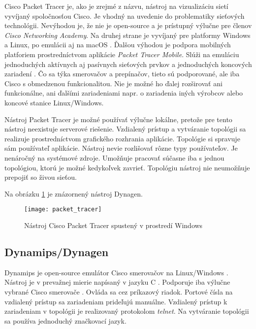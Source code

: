 Cisco Packet Tracer je, ako je zrejmé z názvu, nástroj na vizualizáciu sietí vyvíjaný spoločnosťou Cisco. Je vhodný na uvedenie do problematiky sieťových technológii. Nevýhodou je, že nie je open-source a je prístupný výlučne pre členov \emph{Cisco Networking Academy}. Na druhej strane je vyvíjaný pre platformy Windows a Linux, po emulácii aj na macOS \cite{packet_tracer_mac}. Ďalšou výhodou je podpora mobilných platforiem prostredníctvom aplikácie \emph{Packet Tracer Mobile}. Slúži na emuláciu jednoduchých aktívnych aj pasívnych sieťových prvkov a jednoduchých koncových zariadení \cite{packet_tracer}. Čo sa týka smerovačov a prepínačov, tieto sú podporované, ale iba Cisco s obmedzenou funkcionalitou. Nie je možné ho ďalej rozširovať ani funkcionálne, ani ďalšími zariadeniami napr. o zariadenia iných výrobcov alebo koncové stanice Linux/Windows.

Nástroj Packet Tracer je možné používať výlučne lokálne, pretože pre tento nástroj neexistuje serverové riešenie. Vzdialený prístup a vytváranie topológii sa realizuje prostredníctvom grafického rozhrania aplikácie. Topológie si spravuje sám používateľ aplikácie. Nástroj nevie rozlišovať rôzne typy používateľov. Je nenáročný na systémové zdroje. Umožňuje pracovať súčasne iba s jednou topológiou, ktorú je možné kedykoľvek zavrieť. Topológiu nástroj nie neumožňuje prepojiť so živou sieťou.

Na obrázku \ref{obr:packet_tracer} je znázornený nástroj Dynagen.

\begin{figure}
    \centering
    \texttt{[image: packet\_tracer]}
    \caption{Nástroj Cisco Packet Tracer spustený v prostredí Windows}
    \cite{obr_packet_tracer}
    \label{obr:packet_tracer}
\end{figure}

\subsection{Dynamips/Dynagen}

Dynamips je open-source emulátor Cisco smerovačov na Linux/Windows \cite{dynamips}. Nástroj je v prevažnej mierie napísaný v jazyku C \cite{dynamips_github}. Podporuje iba výlučne vybrané Cisco smerovače \cite{dynamips}. Ovláda sa cez príkazový riadok. Portové čísla na vzdialený prístup sa zariadeniam prideľujú manuálne. Vzdialený prístup k zariadeniam v topológii je realizovaný protokolom \emph{telnet}. Na vytváranie topológii sa používa jednoduchý značkovací jazyk.

